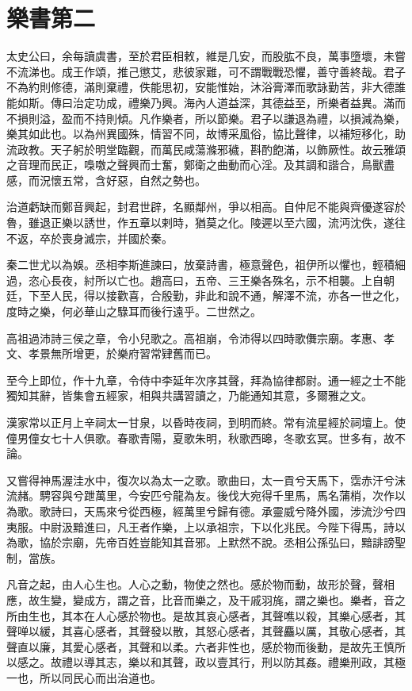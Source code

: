 \chapter{樂書第二}

太史公曰，余每讀虞書，至於君臣相敕，維是几安，而股肱不良，萬事墮壞，未嘗不流涕也。成王作頌，推己懲艾，悲彼家難，可不謂戰戰恐懼，善守善終哉。君子不為約則修德，滿則棄禮，佚能思初，安能惟始，沐浴膏澤而歌詠勤苦，非大德誰能如斯。傳曰治定功成，禮樂乃興。海內人道益深，其德益至，所樂者益異。滿而不損則溢，盈而不持則傾。凡作樂者，所以節樂。君子以謙退為禮，以損減為樂，樂其如此也。以為州異國殊，情習不同，故博采風俗，協比聲律，以補短移化，助流政教。天子躬於明堂臨觀，而萬民咸蕩滌邪穢，斟酌飽滿，以飾厥性。故云雅頌之音理而民正，嘄噭之聲興而士奮，鄭衛之曲動而心淫。及其調和諧合，鳥獸盡感，而況懷五常，含好惡，自然之勢也。

治道虧缺而鄭音興起，封君世辟，名顯鄰州，爭以相高。自仲尼不能與齊優遂容於魯，雖退正樂以誘世，作五章以剌時，猶莫之化。陵遲以至六國，流沔沈佚，遂往不返，卒於喪身滅宗，并國於秦。

秦二世尤以為娛。丞相李斯進諫曰，放棄詩書，極意聲色，祖伊所以懼也，輕積細過，恣心長夜，紂所以亡也。趙高曰，五帝、三王樂各殊名，示不相襲。上自朝廷，下至人民，得以接歡喜，合殷勤，非此和說不通，解澤不流，亦各一世之化，度時之樂，何必華山之騄耳而後行遠乎。二世然之。

高祖過沛詩三侯之章，令小兒歌之。高祖崩，令沛得以四時歌儛宗廟。孝惠、孝文、孝景無所增更，於樂府習常肄舊而已。

至今上即位，作十九章，令侍中李延年次序其聲，拜為協律都尉。通一經之士不能獨知其辭，皆集會五經家，相與共講習讀之，乃能通知其意，多爾雅之文。

漢家常以正月上辛祠太一甘泉，以昏時夜祠，到明而終。常有流星經於祠壇上。使僮男僮女七十人俱歌。春歌青陽，夏歌朱明，秋歌西暤，冬歌玄冥。世多有，故不論。

又嘗得神馬渥洼水中，復次以為太一之歌。歌曲曰，太一貢兮天馬下，霑赤汗兮沫流赭。騁容與兮跇萬里，今安匹兮龍為友。後伐大宛得千里馬，馬名蒲梢，次作以為歌。歌詩曰，天馬來兮從西極，經萬里兮歸有德。承靈威兮降外國，涉流沙兮四夷服。中尉汲黯進曰，凡王者作樂，上以承祖宗，下以化兆民。今陛下得馬，詩以為歌，協於宗廟，先帝百姓豈能知其音邪。上默然不說。丞相公孫弘曰，黯誹謗聖制，當族。

凡音之起，由人心生也。人心之動，物使之然也。感於物而動，故形於聲，聲相應，故生變，變成方，謂之音，比音而樂之，及干戚羽旄，謂之樂也。樂者，音之所由生也，其本在人心感於物也。是故其哀心感者，其聲噍以殺，其樂心感者，其聲啴以緩，其喜心感者，其聲發以散，其怒心感者，其聲麤以厲，其敬心感者，其聲直以廉，其愛心感者，其聲和以柔。六者非性也，感於物而後動，是故先王慎所以感之。故禮以導其志，樂以和其聲，政以壹其行，刑以防其姦。禮樂刑政，其極一也，所以同民心而出治道也。

